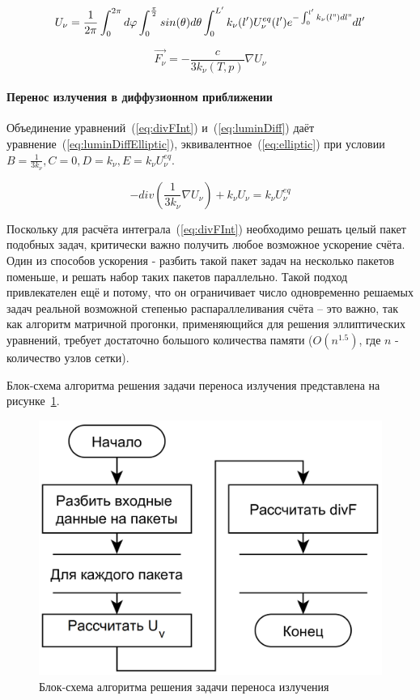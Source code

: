 \begin{equation}
    U_\nu = 
    \frac{1}{2\pi}
    \int_{0}^{2\pi}d\varphi
    \int_{0}^{\frac{\pi}{2}} sin(\theta)d\theta
    \int_{0}^{L'}k_\nu(l')U_\nu^{eq}(l')e^{-\int_{0}^{l'}k_\nu(l")dl"}dl'
    \label{eq:luminInt}
\end{equation}

\begin{equation}
    \vec{F_\nu} = - \frac{c}{3 k_\nu(T, p)} \nabla U_\nu
    \label{eq:luminDiff}
\end{equation}

\paragraph{Перенос излучения в диффузионном приближении}
Объединение уравнений~(\ref{eq:divFInt}) и~(\ref{eq:luminDiff}) даёт 
уравнение~(\ref{eq:luminDiffElliptic}), эквивалентное~(\ref{eq:elliptic}) при 
условии $B = \frac{1}{3 k_\nu}, C = 0, D = k_\nu, E = k_\nu U_\nu^{eq}$.

\begin{equation}
    - div(\frac{1}{3k_\nu} \nabla U_\nu) + k_\nu U_\nu = k_\nu U_\nu^{eq}
    \label{eq:luminDiffElliptic}
\end{equation}

Поскольку для расчёта интеграла~(\ref{eq:divFInt}) необходимо решать целый 
пакет подобных задач, критически важно получить любое возможное ускорение 
счёта. Один из способов ускорения - разбить такой пакет задач на несколько 
пакетов поменьше, и решать набор таких пакетов параллельно. Такой подход 
привлекателен ещё и потому, что он ограничивает число одновременно решаемых 
задач реальной возможной степенью распараллеливания счёта -- это важно, так как 
алгоритм матричной прогонки, применяющийся для решения эллиптических уравнений, 
требует достаточно большого количества памяти ($O(n^{1.5})$, где $n$ - 
количество узлов сетки).

Блок-схема алгоритма решения задачи переноса излучения представлена на 
рисунке~\ref{fig:flowchartLuminDiff}.

\begin{figure}
    \centering
    \includegraphics[width=.5\linewidth]{img/flowchart/luminDiff}
    \caption{Блок-схема алгоритма решения задачи переноса излучения}
    \label{fig:flowchartLuminDiff}
\end{figure}

